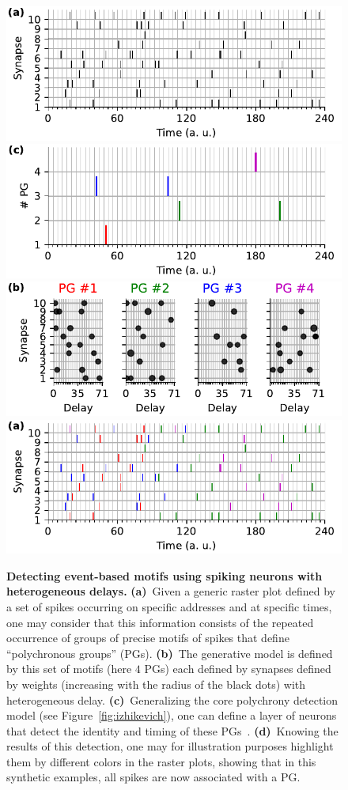 \documentclass[brainsci, %
               review,submit,pdftex,moreauthors
               ]{Definitions/mdpi}
\begin{document}
\begin{figure}%
  \centering
  \includegraphics[width=0.490\linewidth]{figures/THC_1a_k.pdf}
  \includegraphics[width=0.490\linewidth]{figures/THC_1c.pdf}
  \includegraphics[width=0.490\linewidth]{figures/THC_1b.pdf}
  \includegraphics[width=0.490\linewidth]{figures/THC_1a.pdf}
    \caption{\textbf{Detecting event-based motifs using spiking neurons with heterogeneous delays.} 
    {\bf (a)}~Given a generic raster plot defined by a set of spikes occurring on specific addresses and at specific times, one may consider that this information consists of the repeated occurrence of groups of precise motifs of spikes that define ``polychronous groups'' (PGs). 
    {\bf (b)}~The generative model is defined by this set of motifs (here $4$ PGs) each defined by  synapses defined by weights (increasing with the radius of the black dots) with heterogeneous delay. 
    {\bf (c)}~Generalizing the core polychrony detection model (see Figure~\ref{fig:izhikevich}), one can define a layer of neurons that detect the identity and timing of these PGs~\citep{grimaldi_learning_2022}. %
    {\bf (d)}~Knowing the results of this detection, one may for illustration purposes highlight them by different colors in the raster plots, showing that in this synthetic examples, all spikes are now associated with a PG. 
     }
  \label{fig:THC} %
\end{figure}
\end{document}
